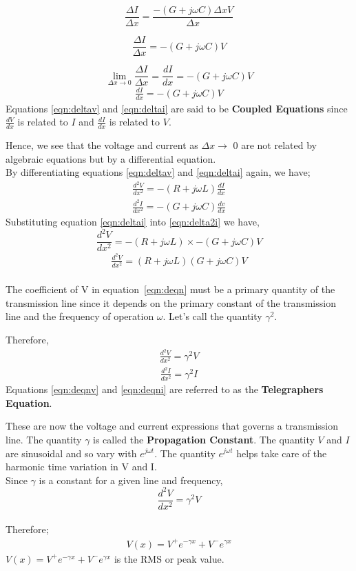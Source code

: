 \[ \frac{	\Delta I }{\Delta x} = \frac{ - (G + j\omega C)\Delta x V}{\Delta x} \]
   
\[ \frac{	\Delta I }{\Delta x} =  - (G + j\omega C) V \]
   
\[ \lim_{ \Delta x\to 0}	\frac{ \Delta I}{ \Delta x} = \frac{dI}{dx} = - (G + j\omega C)V \]
\begin{align}
\frac{dI}{dx} = - (G + j\omega C)V 
\label{eqn:deltai}
\end{align}
Equations \ref{eqn:deltav} and \ref{eqn:deltai} are said to be \textbf{Coupled Equations} since $ \frac{dV}{dx} $ is related to $I$ and $ \frac{dI}{dx} $  is related to $V$.

Hence, we see that the voltage and current as $ \Delta x \rightarrow $ 0 are not related by algebraic equations but by a differential equation.\\
By differentiating equations \ref{eqn:deltav} and \ref{eqn:deltai} again, we have; 
\begin{align}
\frac{d^{2}V}{dx^{2}} = - (R + j\omega L)\frac{dI}{dx} 
\label{eqn:delta2v}
\end{align}
\begin{align}
\frac{d^{2}I}{dx^{2}} = - (G + j\omega C)\frac{dv}{dx}
\label{eqn:delta2i}
\end{align}
Substituting equation \ref{eqn:deltai} into \ref{eqn:delta2i} we have,
\[ 	\frac{d^{2}V}{dx^{2}} = - (R + j\omega L)\times {- (G + j\omega C)V} \]
\begin{align}
 \frac{d^{2}V}{dx^{2}} = (R + j\omega L)(G + j\omega C)V 
\label{eqn:deqn}
\end{align}   
\\
The coefficient of V in equation~\ref{eqn:deqn} must be a primary quantity of the transmission line since it depends on the primary constant of the transmission line and the frequency of operation $ \omega$. Let's call the quantity $ \gamma^{2}. $ 

Therefore, 
\begin{align}
\frac{d^{2}V}{dx^{2}} = \gamma^{2}V 
\label{eqn:deqnv}
\end{align}
\begin{align}
\frac{d^{2}I}{dx^{2}} = \gamma^{2}I 
\label{eqn:deqni}
\end{align}
Equations \ref{eqn:deqnv} and \ref{eqn:deqni} are referred to as the \textbf{Telegraphers Equation}.

These are now the voltage and current expressions that governs a transmission line. The quantity $ \gamma $ is called the \textbf{Propagation Constant}. The quantity $V$ and $I$ are sinusoidal and so vary with $ e ^{j\omega t}$. The quantity $ e ^{j\omega t} $ helps take care of the harmonic time variation in V and I. \\
Since $ \gamma $ is a constant for a given line and frequency, 
\[ \frac{d^{2}V}{dx^{2}} = \gamma^{2}V\]\\
Therefore; 
\begin{align}
V(x) = V^{+} e ^{- \gamma x} + V^{-}e^{\gamma x}  
\label{eqn:solnv}
\end{align}
$ 	V(x) = V^{+} e ^{- \gamma x} + V^{-}e^{\gamma x} $  is the RMS or peak value. 

